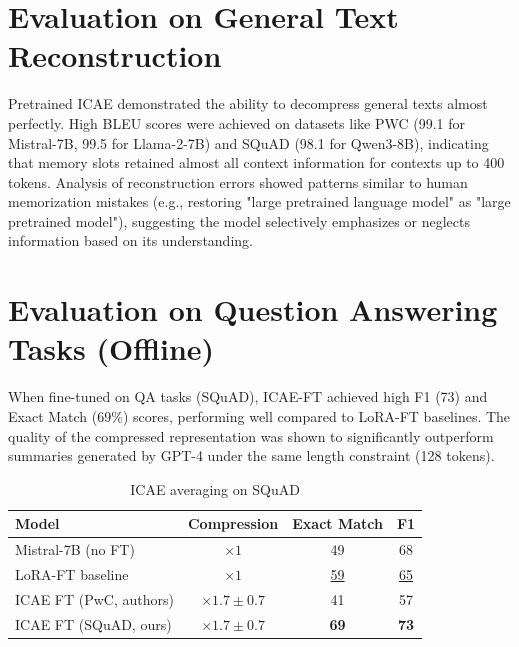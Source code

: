 \section{Evaluation on General Text Reconstruction}

Pretrained ICAE \cite{ge_-context_2024} demonstrated the ability to decompress general texts almost perfectly.
High BLEU scores were achieved on datasets like PWC (99.1 for Mistral-7B, 99.5 for Llama-2-7B) and SQuAD (98.1 for Qwen3-8B), indicating that memory slots retained almost all context information for contexts up to 400 tokens.
Analysis of reconstruction errors showed patterns similar to human memorization mistakes (e.g., restoring "large pretrained language model" as "large pretrained model"), suggesting the model selectively emphasizes or neglects information based on its understanding.


\section{Evaluation on Question Answering Tasks (Offline)}

When fine-tuned on QA tasks (SQuAD), ICAE-FT \cite{ge_-context_2024} achieved high F1 (73) and Exact Match (69\%) scores, performing well compared to LoRA-FT baselines.
The quality of the compressed representation was shown to significantly outperform summaries generated by GPT-4 under the same length constraint (128 tokens).

\begin{table}[h]
    \centering
    \begin{tabular}{lccc}
        \toprule
        \textbf{Model} &
        \textbf{Compression} &
        \textbf{Exact Match} &
        \textbf{F1} \\
        \midrule
        Mistral-7B (no FT)          & ×$1$         & 49 & 68 \\
        LoRA-FT baseline            & ×$1$         & \underline{59} & \underline{65} \\
        ICAE FT (PwC, authors)       & ×$1.7\pm0.7$ & 41 & 57 \\
        ICAE FT (SQuAD, ours)              & ×$1.7\pm0.7$ & \textbf{69} & \textbf{73} \\
        \bottomrule
    \end{tabular}
    \caption{ICAE averaging on SQuAD}
    \label{tab:icae_squad}
\end{table}


